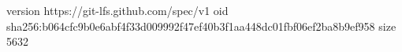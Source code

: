 version https://git-lfs.github.com/spec/v1
oid sha256:b064cfc9b0e6abf4f33d009992f47ef40b3f1aa448dc01fbf06ef2ba8b9ef958
size 5632
